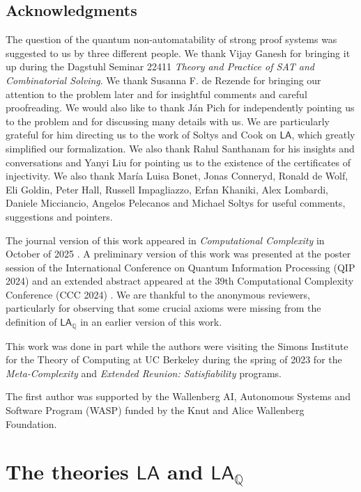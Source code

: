 \documentclass[11pt]{article}
\newcommand{\LA}{\mathsf{LA}}
\newcommand{\LAQ}{\mathsf{LA}_\mathbb{Q}}
\theoremstyle{definition}
\theoremstyle{plain}
\theoremstyle{remark}
\begin{document}
\subsection*{Acknowledgments}
The question of the quantum non-automatability of strong proof systems was suggested to us by three different people. We thank Vijay Ganesh for bringing it up during the Dagstuhl Seminar 22411 \emph{Theory and Practice of SAT and Combinatorial Solving}. We thank Susanna F. de Rezende for bringing our attention to the problem later and for insightful comments and careful proofreading. We would also like to thank Ján Pich for independently pointing us to the problem and for discussing many details with us. We are particularly grateful for him directing us to the work of Soltys and Cook on $\LA$, which greatly simplified our formalization. We also thank Rahul Santhanam for his insights and conversations and Yanyi Liu for pointing us to the existence of the certificates of injectivity. We also thank María Luisa Bonet, Jonas Conneryd, Ronald de Wolf, Eli Goldin, Peter Hall, Russell Impagliazzo, Erfan Khaniki, Alex Lombardi, Daniele Micciancio, Angelos Pelecanos and Michael Soltys for useful comments, suggestions and pointers.

The journal version of this work appeared in \emph{Computational Complexity} in October of 2025 \cite{ACG25_CC_journal}. A preliminary version of this work was presented at the poster session of the International Conference on Quantum Information Processing (QIP 2024) and an extended abstract appeared at the 39th Computational Complexity Conference (CCC 2024) \cite{ACG24_CCC}. We are thankful to the anonymous reviewers, particularly for observing that some crucial axioms were missing from the definition of $\LAQ$ in an earlier version of this work.


This work was done in part while the authors were visiting the Simons Institute for the Theory of Computing at UC Berkeley during the spring of 2023 for the \emph{Meta-Complexity} and \emph{Extended Reunion: Satisfiability} programs.

The first author was supported by the Wallenberg AI, Autonomous Systems and Software Program (WASP) funded by the Knut and Alice Wallenberg Foundation.



\newpage
\appendix

\section{The theories $\LA$ and $\LAQ$}
\end{document}
